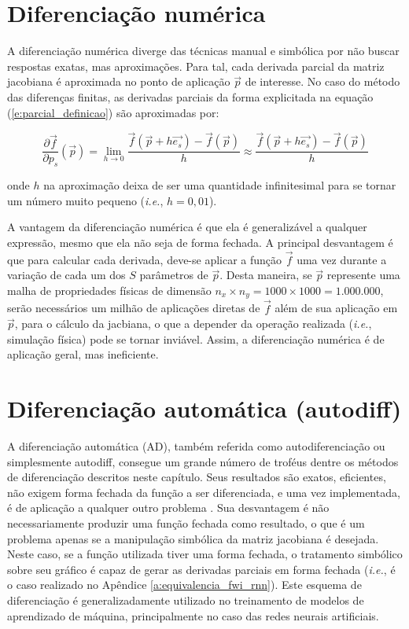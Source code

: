   \section{Diferenciação numérica} \label{s:diferenciacao_numerica}

    A diferenciação numérica diverge das técnicas manual e simbólica por não buscar respostas exatas, mas aproximações. Para tal, cada derivada parcial da matriz jacobiana é aproximada no ponto de aplicação $\vec{p}$ de interesse. No caso do método das diferenças finitas, as derivadas parciais da forma explicitada na equação (\ref{e:parcial_definicao}) são aproximadas por:

    \begin{equation} \label{e:parcial_aproximada_diff_finitas}
      \frac{\partial \vec{f}}{\partial p_s}(\vec{p})
      =
      \lim_{h \to 0} \frac{\vec{f}(\vec{p} + h \vec{e_s}) - \vec{f}(\vec{p})}{h}
      \approx
      \frac{\vec{f}(\vec{p} + h \vec{e_s}) - \vec{f}(\vec{p})}{h}
    \end{equation}

    \noindent onde $h$ na aproximação deixa de ser uma quantidade infinitesimal para se tornar um número muito pequeno (\textit{i.e.}, $h=0,01$).

    A vantagem da diferenciação numérica é que ela é generalizável a qualquer expressão, mesmo que ela não seja de forma fechada. A principal desvantagem é que para calcular cada derivada, deve-se aplicar a função $\vec{f}$ uma vez durante a variação de cada um dos $S$ parâmetros de $\vec{p}$. Desta maneira, se $\vec{p}$ represente uma malha de propriedades físicas de dimensão $n_x\times n_y = 1000 \times 1000 = 1.000.000$, serão necessários um milhão de aplicações diretas de $\vec{f}$ além de sua aplicação em $\vec{p}$, para o cálculo da jacbiana, o que a depender da operação realizada (\textit{i.e.}, simulação física) pode se tornar inviável. Assim, a diferenciação numérica é de aplicação geral, mas ineficiente.

  \section{Diferenciação automática (autodiff)}


    A diferenciação automática (AD), também referida como autodiferenciação ou simplesmente autodiff, consegue um grande número de troféus dentre os métodos de diferenciação descritos neste capítulo. Seus resultados são exatos, eficientes, não exigem forma fechada da função a ser diferenciada, e uma vez implementada, é de aplicação a qualquer outro problema . Sua desvantagem é não necessariamente produzir uma função fechada como resultado, o que é um problema apenas se a manipulação simbólica da matriz jacobiana é desejada. Neste caso, se a função utilizada tiver uma forma fechada, o tratamento simbólico sobre seu gráfico é capaz de gerar as derivadas parciais em forma fechada (\textit{i.e.}, é o caso realizado no Apêndice \ref{a:equivalencia_fwi_rnn}). Este esquema de diferenciação é generalizadamente utilizado no treinamento de modelos de aprendizado de máquina, principalmente no caso das redes neurais artificiais.


